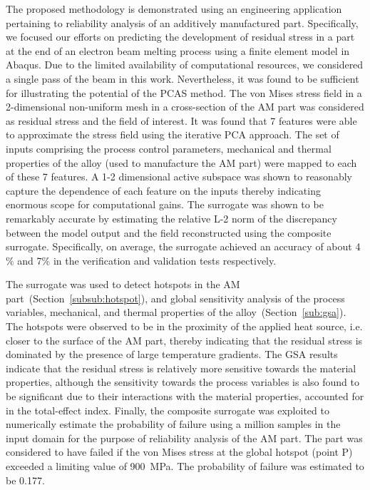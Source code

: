 The proposed methodology is demonstrated using an engineering application pertaining to reliability analysis of
an additively manufactured part. Specifically, we focused our efforts on predicting the development of residual
stress in a part at the end of an electron beam melting process using a finite element model in Abaqus.
Due to the limited availability of computational
resources, we considered a single pass of the beam in this work. Nevertheless, it was found to be sufficient for
illustrating the potential of the PCAS method. The von Mises stress field in a 2-dimensional non-uniform mesh
in a cross-section of the AM part was considered as residual stress and the field of interest. It was found that
7 features were able to approximate the stress field using the iterative PCA approach. The set of inputs
comprising the process control parameters, mechanical and thermal properties of the alloy (used to manufacture the
AM part) were mapped to each of these 7 features. A 1-2 dimensional active subspace was shown to reasonably
capture the dependence of each feature on the inputs thereby indicating enormous scope for computational gains.
The surrogate was shown to be remarkably accurate by estimating the relative L-2 norm of the discrepancy
between the model output and the field reconstructed using the composite surrogate. Specifically, on average, the
surrogate achieved an accuracy of about 4$\%$ and 7$\%$ in the verification and validation tests respectively.

The surrogate was used to detect hotspots in the AM part~(Section~\ref{subsub:hotspot}), and global sensitivity
analysis of the process variables, mechanical, and thermal properties of the alloy~(Section~\ref{sub:gsa}). 
The hotspots were observed to be in the proximity of the applied heat source, i.e. closer to the surface of the
AM part, thereby indicating that the residual stress is dominated by the presence of large temperature gradients.
The GSA results 
indicate that the residual stress is relatively more sensitive towards the material properties, although the sensitivity
towards the process variables is also found to be significant due to their interactions with the material properties,
accounted for in the total-effect index. Finally, the composite surrogate was exploited to numerically estimate the
probability of failure using a million samples in the input domain for the purpose of reliability analysis of the AM part. 
The part was considered to have failed if the von Mises stress at the global hotspot (point P) exceeded a limiting 
value of 900~MPa. The probability of failure was estimated to be 0.177. 

